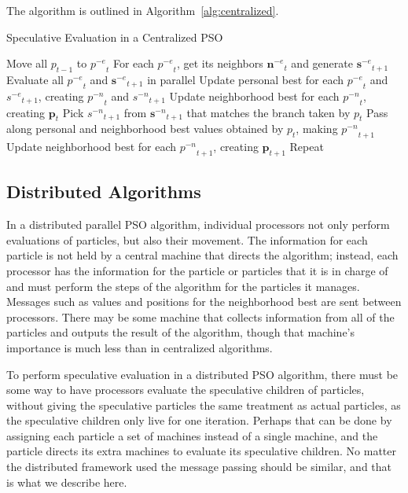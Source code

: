 \documentclass[conference,letterpaper]{IEEEtran}
\newcommand{\alg}[1]{Algorithm~\ref{alg:#1}}
\providecommand{\noeval}[1]{\ensuremath{#1^{-e}}}
\providecommand{\nonbest}[1]{\ensuremath{#1^{-n}}}
\providecommand{\p}{\ensuremath{p}}
\providecommand{\pset}{\ensuremath{\mathbf{p}}}
\providecommand{\s}{\ensuremath{s}}
\providecommand{\sset}{\ensuremath{\mathbf{s}}}
\providecommand{\nset}{\ensuremath{\mathbf{n}}}
\begin{document}
The algorithm is outlined in \alg{centralized}.

\begin{algorithm}
  \caption{Speculative Evaluation in a Centralized PSO}
  \label{alg:centralized}
  \begin{algorithmic}[1]
	\STATE Move all $\p_{t-1}$ to $\noeval{\p}_t$
	\STATE For each $\noeval{\p}_t$, get its neighbors $\noeval{\nset}_t$ and
	  generate $\noeval{\sset}_{t+1}$
	\STATE Evaluate all $\noeval{\p}_t$ and $\noeval{\sset}_{t+1}$ in parallel
	\STATE Update personal best for each $\noeval{\p}_t$ and
	  $\noeval{\s}_{t+1}$, creating $\nonbest{\p}_t$ and $\nonbest{\s}_{t+1}$
	\STATE Update neighborhood best for each $\nonbest{\p}_t$, creating
	  $\pset_t$
	\FORALL{$\p_t$}
	\STATE Pick $\nonbest{\s}_{t+1}$ from $\nonbest{\sset}_{t+1}$ that matches
	  the branch taken by $\p_t$
	\STATE Pass along personal and neighborhood best values obtained by $\p_t$,
	  making $\nonbest{\p}_{t+1}$
	\ENDFOR
	\STATE Update neighborhood best for each $\nonbest{\p}_{t+1}$, creating
	  $\pset_{t+1}$
	\STATE Repeat
  \end{algorithmic}
\end{algorithm}

\subsection{Distributed Algorithms}

In a distributed parallel PSO algorithm, individual processors not only perform
evaluations of particles, but also their movement.  The information for each
particle is not held by a central machine that directs the algorithm; instead,
each processor has the information for the particle or particles that it is in
charge of and must perform the steps of the algorithm for the particles it
manages.  Messages such as values and positions for the neighborhood best are
sent between processors.  There may be some machine that collects information
from all of the particles and outputs the result of the algorithm, though that
machine's importance is much less than in centralized algorithms.

To perform speculative evaluation in a distributed PSO algorithm, there must be
some way to have processors evaluate the speculative children of particles,
without giving the speculative particles the same treatment as actual
particles, as the speculative children only live for one iteration.  Perhaps
that can be done by assigning each particle a set of machines instead of a
single machine, and the particle directs its extra machines to evaluate its
speculative children.  No matter the distributed framework used the message
passing should be similar, and that is what we describe here.
\end{document}
